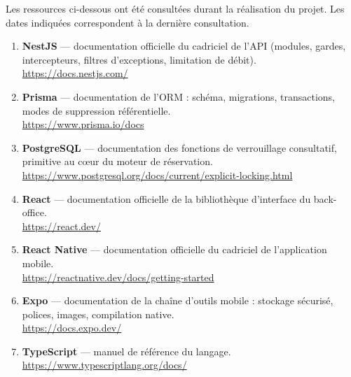 
Les ressources ci-dessous ont été consultées durant la réalisation du projet.
Les dates indiquées correspondent à la dernière consultation.

\vspace{0.4cm}

\begin{enumerate}[leftmargin=1.1cm,itemsep=6pt]

  \item \textbf{NestJS} --- documentation officielle du cadriciel de l'API
  (modules, gardes, intercepteurs, filtres d'exceptions, limitation de débit).
  \\ \url{https://docs.nestjs.com/}

  \item \textbf{Prisma} --- documentation de l'ORM : schéma, migrations,
  transactions, modes de suppression référentielle.
  \\ \url{https://www.prisma.io/docs}

  \item \textbf{PostgreSQL} --- documentation des fonctions de verrouillage
  consultatif, primitive au c\oe ur du moteur de réservation.
  \\ \url{https://www.postgresql.org/docs/current/explicit-locking.html}

  \item \textbf{React} --- documentation officielle de la bibliothèque
  d'interface du back-office.
  \\ \url{https://react.dev/}

  \item \textbf{React Native} --- documentation officielle du cadriciel de
  l'application mobile.
  \\ \url{https://reactnative.dev/docs/getting-started}

  \item \textbf{Expo} --- documentation de la chaîne d'outils mobile : stockage
  sécurisé, polices, images, compilation native.
  \\ \url{https://docs.expo.dev/}

  \item \textbf{TypeScript} --- manuel de référence du langage.
  \\ \url{https://www.typescriptlang.org/docs/}


\end{enumerate}
